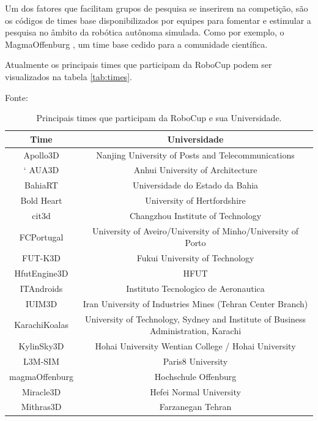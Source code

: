 Um dos fatores que facilitam grupos de pesquisa se inserirem na competição, são os códigos de times base disponibilizados por equipes para
fomentar e estimular a pesquisa no \^ambito da robótica autônoma simulada. Como por exemplo, o MagmaOffenburg \cite{magma}, um time
base cedido para a comunidade científica.

Atualmente os principais times que participam da RoboCup podem ser visualizados na tabela \ref{tab:times}.

\begin{table}[!htb]

\centering
\caption{Principais times que participam da RoboCup e sua Universidade.} Fonte: \cite{SimulationLeague} 

  \begin{tabular}{|c|c|}
    \hline
    \hline
    Time & Universidade \\
    \hline
    \hline
    Apollo3D & Nanjing University of Posts and Telecommunications \\
    \hline`
    AUA3D & Anhui University of Architecture \\
    \hline
    BahiaRT & Universidade do Estado da Bahia \\
    \hline
    Bold Heart & University of Hertfordshire \\
    \hline
    cit3d & Changzhou Institute of Technology \\
    \hline
    FCPortugal & University of Aveiro/University of Minho/University of Porto \\
    \hline
    FUT-K3D & Fukui University of Technology \\
    \hline
    HfutEngine3D & HFUT \\
    \hline
    ITAndroids & Instituto Tecnologico de Aeronautica \\
    \hline
    IUIM3D & Iran University of Industries Mines (Tehran Center Branch) \\
    \hline
    KarachiKoalas & University of Technology, Sydney and Institute of Business Administration, Karachi \\
    \hline
    KylinSky3D & Hohai University Wentian College / Hohai University \\
    \hline
    L3M-SIM & Paris8 University \\
    \hline
    magmaOffenburg & Hochschule Offenburg \\
    \hline
    Miracle3D & Hefei Normal University \\
    \hline
    Mithras3D & Farzanegan Tehran \\

\end{tabular}
\end{table}
